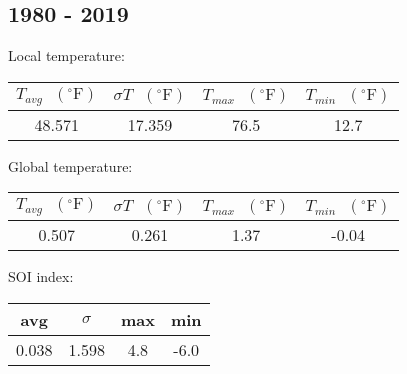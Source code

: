 \documentclass[12pt]{article}
\begin{document}
\subsection*{1980 - 2019}
Local temperature:
\begin{center}
\begin{tabular}{c | c | c | c}
	$T_{avg} \textrm{ } (^{\circ} \textrm{F})$ &
	$\sigma T \textrm{ } (^{\circ} \textrm{F})$ &
	$T_{max} \textrm{ } (^{\circ} \textrm{F})$ &
	$T_{min} \textrm{ } (^{\circ} \textrm{F})$ \\ %
	\hline
	48.571 & 17.359 & 76.5 & 12.7 \\ %
\end{tabular}
\end{center}
Global temperature:
\begin{center}
\begin{tabular}{c | c | c | c}
	$T_{avg} \textrm{ } (^{\circ} \textrm{F})$ &
	$\sigma T \textrm{ } (^{\circ} \textrm{F})$ &
	$T_{max} \textrm{ } (^{\circ} \textrm{F})$ &
	$T_{min} \textrm{ } (^{\circ} \textrm{F})$ \\ %
	\hline
	0.507 & 0.261 & 1.37 & -0.04 \\ %
\end{tabular}
\end{center}
SOI index:
\begin{center}
\begin{tabular}{c | c | c | c}
	avg & $\sigma$ & max & min \\ %
	\hline
	0.038 & 1.598 & 4.8 & -6.0 \\ %
\end{tabular}
\end{center}

\doublespacing
\end{document}
